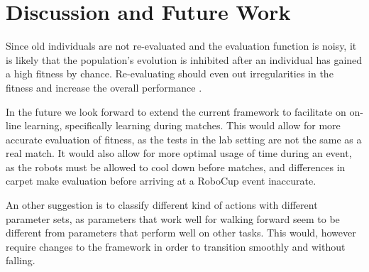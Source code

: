 \documentclass{article}
\begin{document}
\section{Discussion and Future Work}
Since old individuals are not re-evaluated and the evaluation function is
noisy, it is likely that the population's evolution is inhibited after an
individual has gained a high fitness by chance. Re-evaluating should even out 
irregularities in the fitness and increase the overall performance
\cite{nordin1997line}.

In the future we look forward to extend the current framework to facilitate on
on-line learning, specifically learning during matches.
This would allow for more accurate evaluation of fitness, as the tests in the 
lab setting are not the same as a real match. It would also allow for more
optimal usage of time during an event, as the robots must be allowed to cool
down before matches, and differences in carpet make evaluation before arriving
at a RoboCup event inaccurate.

An other suggestion is to classify different kind of actions with different
parameter sets, as parameters that work well for walking forward seem to be
different from parameters that perform well on other tasks. This would, however
require changes to the framework in order to transition smoothly and without
falling.




\end{document}
